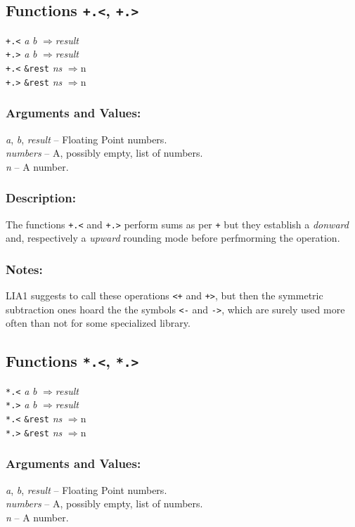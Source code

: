 \documentclass[10pt,fleqn]{article}
\newcommand{\code}[1]{\texttt{#1}}
\newcommand{\varname}[1]{\textit{#1}}
\newcommand{\RArrow}{$\Rightarrow$}
\newcommand{\DDictionaryItem}[1]{\vspace*{6pt}\noindent\hrulefill\vspace*{-9pt}\subsection*{#1}}
\newcommand{\DArgsNValues}{\subsubsection*{Arguments and Values:}}
\newcommand{\DDescription}{\subsubsection*{Description:}}
\newcommand{\DNotes}{\subsubsection*{Notes:}}
\begin{document}
\DDictionaryItem{Functions \code{+.<}, \code{+.>}}
\index{*!\code{+.<}}
\index{*!\code{+.>}}


\code{+.<} \varname{a} \varname{b} \RArrow \varname{result}\\
\code{+.>} \varname{a} \varname{b} \RArrow \varname{result}\\
\code{+.<} \code{\&rest} \varname{ns} \RArrow \varname \code{n}\\
\code{+.>} \code{\&rest} \varname{ns} \RArrow \varname \code{n}\\

\DArgsNValues{}

\varname{a}, \varname{b}, \varname{result} -- Floating Point numbers.\\
\varname{numbers} -- A, possibly empty, list of numbers.\\
\varname{n} -- A number.

\DDescription{}

The functions  \code{+.<} and \code{+.>} perform sums as per \code{+}
but they establish a \emph{donward} and, respectively a
\emph{upward} rounding mode before perfmorming the operation.

\DNotes{}

LIA1 suggests to call these operations \code{<+} and \code{+>}, but
then the symmetric subtraction ones hoard the the symbols \code{<-}
and \code{->}, which are surely used more often than not for some
specialized library.


\DDictionaryItem{Functions \code{*.<}, \code{*.>}}
\index{*!\code{*.<}}
\index{*!\code{*.>}}


\code{*.<} \varname{a} \varname{b} \RArrow \varname{result}\\
\code{*.>} \varname{a} \varname{b} \RArrow \varname{result}\\
\code{*.<} \code{\&rest} \varname{ns} \RArrow \varname \code{n}\\
\code{*.>} \code{\&rest} \varname{ns} \RArrow \varname \code{n}\\

\DArgsNValues{}

\varname{a}, \varname{b}, \varname{result} -- Floating Point numbers.\\
\varname{numbers} -- A, possibly empty, list of numbers.\\
\varname{n} -- A number.
\end{document}

